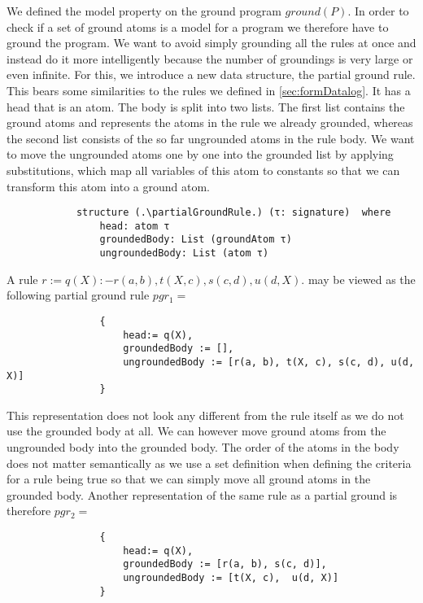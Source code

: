         We defined the model property on the ground program $ground(P)$. In order to check if a set of ground atoms is a model for a program we therefore have to ground the program. We want to avoid simply grounding all the rules at once and instead do it more intelligently because the number of groundings is very large or even infinite.  For this, we introduce a new data structure, the partial ground rule. This bears some similarities to the rules we defined in \cref{sec:formDatalog}. It has a head that is an atom. The body is split into two lists. The first list contains the ground atoms and represents the atoms in the rule we already grounded, whereas the second list consists of the so far ungrounded atoms in the rule body. We want to move the ungrounded atoms one by one into the grounded list by applying substitutions, which map all variables of this atom to constants so that we can transform this atom into a ground atom.

        \begin{lstlisting}
            structure (.\partialGroundRule.) (τ: signature)  where
                head: atom τ
                groundedBody: List (groundAtom τ)
                ungroundedBody: List (atom τ)
        \end{lstlisting}

        \begin{example}
            A rule $r := q(X) :- r(a, b), t(X, c), s(c, d), u(d, X) .$ may be viewed as the following partial ground rule
            $pgr_1 = $
            \begin{lstlisting}
                {
                    head:= q(X),
                    groundedBody := [],
                    ungroundedBody := [r(a, b), t(X, c), s(c, d), u(d, X)]
                }
            \end{lstlisting}
            
            This representation does not look any different from the rule itself as we do not use the grounded body at all. We can however move ground atoms from the ungrounded body into the grounded body. The order of the atoms in the body does not matter semantically as we use a set definition when defining the criteria for a rule being true so that we can simply move all ground atoms in the grounded body. Another representation of the same rule as a partial ground is therefore $pgr_2=$

            \begin{lstlisting}
                {
                    head:= q(X),
                    groundedBody := [r(a, b), s(c, d)],
                    ungroundedBody := [t(X, c),  u(d, X)]
                }
            \end{lstlisting}

        \end{example}

